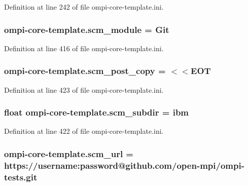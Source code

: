 Definition at line 242 of file ompi-\/core-\/template.\-ini.

\hypertarget{namespaceompi-core-template_afa2204401b4cd6514dd6997ff3f38dc6}{
\subsubsection[{scm\-\_\-module}]{\setlength{\rightskip}{0pt plus 5cm}ompi-\/core-\/template.\-scm\-\_\-module = Git}}\label{namespaceompi-core-template_afa2204401b4cd6514dd6997ff3f38dc6}


Definition at line 416 of file ompi-\/core-\/template.\-ini.

\hypertarget{namespaceompi-core-template_a8a118b9a1ada232fcd1d1f042d7d00ab}{
\subsubsection[{scm\-\_\-post\-\_\-copy}]{\setlength{\rightskip}{0pt plus 5cm}ompi-\/core-\/template.\-scm\-\_\-post\-\_\-copy = $<$$<$E\-O\-T}}\label{namespaceompi-core-template_a8a118b9a1ada232fcd1d1f042d7d00ab}


Definition at line 423 of file ompi-\/core-\/template.\-ini.

\hypertarget{namespaceompi-core-template_a5373b4e1981d8856efbaed9c52074bae}{
\subsubsection[{scm\-\_\-subdir}]{\setlength{\rightskip}{0pt plus 5cm}float ompi-\/core-\/template.\-scm\-\_\-subdir = ibm}}\label{namespaceompi-core-template_a5373b4e1981d8856efbaed9c52074bae}


Definition at line 422 of file ompi-\/core-\/template.\-ini.

\hypertarget{namespaceompi-core-template_a2ed15964d614776a50965e42acd911ec}{
\subsubsection[{scm\-\_\-url}]{\setlength{\rightskip}{0pt plus 5cm}ompi-\/core-\/template.\-scm\-\_\-url = https\-://username\-:password@github.\-com/open-\/mpi/ompi-\/tests.\-git}}\label{namespaceompi-core-template_a2ed15964d614776a50965e42acd911ec}


